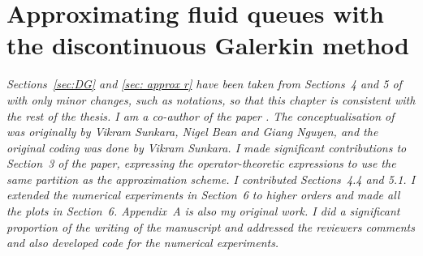 \chapter{Approximating fluid queues with the discontinuous Galerkin method \label{ch:galerkin}} 
\begin{center}
\begin{minipage}{0.8\textwidth}
    \textit{Sections~\ref{sec:DG} and \ref{sec: approx r} have been taken from Sections~4 and 5 of \cite{blnos2022} with only minor changes, such as notations, so that this chapter is consistent with the rest of the thesis. I am a co-author of the paper \cite{blnos2022}. The conceptualisation of \cite{blnos2022} was originally by Vikram Sunkara, Nigel Bean and Giang Nguyen, and the original coding was done by Vikram Sunkara. I made significant contributions to Section~3 of the paper, expressing the operator-theoretic expressions to use the same partition as the approximation scheme. I contributed Sections~4.4 and 5.1. I extended the numerical experiments in Section~6 to higher orders and made all the plots in Section~6. Appendix~A is also my original work. I did a significant proportion of the writing of the manuscript and addressed the reviewers comments and also developed code for the numerical experiments.
    }
\end{minipage}
\end{center}


